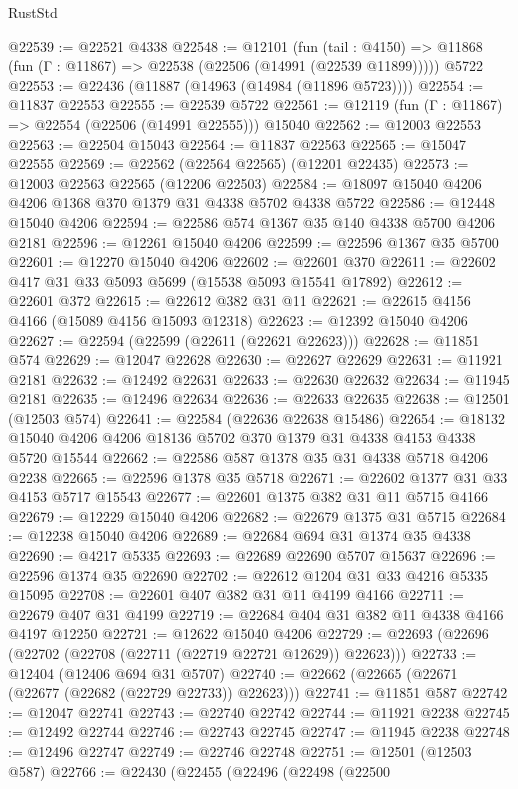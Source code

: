 \begin{lexlean}{RustStd}
\begin{coremodule}
@22539 := @22521 @4338
@22548 := @12101
    (fun (tail : @4150) => @11868 (fun (Γ : @11867) => @22538 (@22506 (@14991 (@22539 @11899)))))
    @5722
@22553 := @22436 (@11887 (@14963 (@14984 (@11896 @5723))))
@22554 := @11837 @22553
@22555 := @22539 @5722
@22561 := @12119 (fun (Γ : @11867) => @22554 (@22506 (@14991 @22555))) @15040
@22562 := @12003 @22553
@22563 := @22504 @15043
@22564 := @11837 @22563
@22565 := @15047 @22555
@22569 := @22562 (@22564 @22565) (@12201 @22435)
@22573 := @12003 @22563 @22565 (@12206 @22503)
@22584 := @18097 @15040 @4206 @4206 @1368 @370 @1379 @31 @4338 @5702 @4338 @5722
@22586 := @12448 @15040 @4206
@22594 := @22586 @574 @1367 @35 @140 @4338 @5700 @4206 @2181
@22596 := @12261 @15040 @4206
@22599 := @22596 @1367 @35 @5700
@22601 := @12270 @15040 @4206
@22602 := @22601 @370
@22611 := @22602 @417 @31 @33 @5093 @5699 (@15538 @5093 @15541 @17892)
@22612 := @22601 @372
@22615 := @22612 @382 @31 @11
@22621 := @22615 @4156 @4166 (@15089 @4156 @15093 @12318)
@22623 := @12392 @15040 @4206
@22627 := @22594 (@22599 (@22611 (@22621 @22623)))
@22628 := @11851 @574
@22629 := @12047 @22628
@22630 := @22627 @22629
@22631 := @11921 @2181
@22632 := @12492 @22631
@22633 := @22630 @22632
@22634 := @11945 @2181
@22635 := @12496 @22634
@22636 := @22633 @22635
@22638 := @12501 (@12503 @574)
@22641 := @22584 (@22636 @22638 @15486)
@22654 := @18132 @15040 @4206 @4206 @18136 @5702 @370 @1379 @31 @4338 @4153 @4338 @5720 @15544
@22662 := @22586 @587 @1378 @35 @31 @4338 @5718 @4206 @2238
@22665 := @22596 @1378 @35 @5718
@22671 := @22602 @1377 @31 @33 @4153 @5717 @15543
@22677 := @22601 @1375 @382 @31 @11 @5715 @4166
@22679 := @12229 @15040 @4206
@22682 := @22679 @1375 @31 @5715
@22684 := @12238 @15040 @4206
@22689 := @22684 @694 @31 @1374 @35 @4338
@22690 := @4217 @5335
@22693 := @22689 @22690 @5707 @15637
@22696 := @22596 @1374 @35 @22690
@22702 := @22612 @1204 @31 @33 @4216 @5335 @15095
@22708 := @22601 @407 @382 @31 @11 @4199 @4166
@22711 := @22679 @407 @31 @4199
@22719 := @22684 @404 @31 @382 @11 @4338 @4166 @4197 @12250
@22721 := @12622 @15040 @4206
@22729 := @22693 (@22696 (@22702 (@22708 (@22711 (@22719 @22721 @12629)) @22623)))
@22733 := @12404 (@12406 @694 @31 @5707)
@22740 := @22662 (@22665 (@22671 (@22677 (@22682 (@22729 @22733)) @22623)))
@22741 := @11851 @587
@22742 := @12047 @22741
@22743 := @22740 @22742
@22744 := @11921 @2238
@22745 := @12492 @22744
@22746 := @22743 @22745
@22747 := @11945 @2238
@22748 := @12496 @22747
@22749 := @22746 @22748
@22751 := @12501 (@12503 @587)
@22766 := @22430
    (@22455
      (@22496
        (@22498
          (@22500

\end{coremodule}
\end{lexlean}

